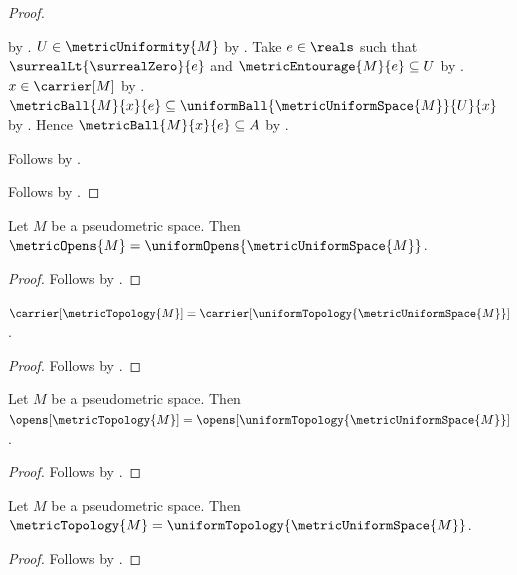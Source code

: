 \begin{proof}
\begin{subproof}
\begin{subproof}
                by .
            $U\in\metricUniformity{M}$
                by .
            Take $e\in\reals$ such that
                $\surrealLt{\surrealZero}{e}$ and
                $\metricEntourage{M}{e}\subseteq U$
                by .
            $x\in\carrier[M]$ by .
            $\metricBall{M}{x}{e}
                \subseteq\uniformBall{\metricUniformSpace{M}}{U}{x}$
                by .
            Hence $\metricBall{M}{x}{e}\subseteq A$
                by .
        \end{subproof}
        Follows by .
    \end{subproof}
    Follows by \auto.
\end{proof}

\begin{theorem}\label{metric_uniform_opens_agree}
    Let $M$ be a pseudometric space.
    Then
        $\metricOpens{M}
            =\uniformOpens{\metricUniformSpace{M}}$.
\end{theorem}
\begin{proof}
    Follows by
        .
\end{proof}

\begin{proposition}\label{metric_uniform_topology_carriers_agree}
    $\carrier[\metricTopology{M}]
        =\carrier[\uniformTopology{\metricUniformSpace{M}}]$.
\end{proposition}
\begin{proof}
    Follows by
        .
\end{proof}

\begin{theorem}\label{metric_uniform_topology_opens_agree}
    Let $M$ be a pseudometric space.
    Then
        $\opens[\metricTopology{M}]
            =\opens[\uniformTopology{\metricUniformSpace{M}}]$.
\end{theorem}
\begin{proof}
    Follows by
        .
\end{proof}

\begin{theorem}\label{metric_uniform_topologies_agree}
    Let $M$ be a pseudometric space.
    Then
        $\metricTopology{M}
            =\uniformTopology{\metricUniformSpace{M}}$.
\end{theorem}
\begin{proof}
    Follows by
        .
\end{proof}

